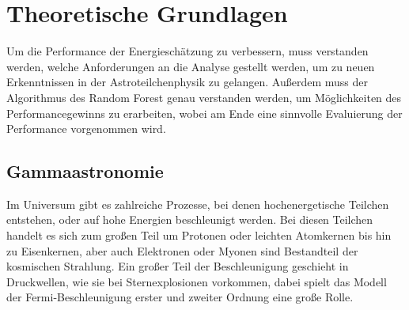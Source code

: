 \chapter{Theoretische Grundlagen}

Um die Performance der Energieschätzung zu verbessern, muss verstanden werden, welche Anforderungen an die Analyse gestellt
werden, um zu neuen Erkenntnissen in der Astroteilchenphysik zu gelangen.
Außerdem muss der Algorithmus des Random Forest genau verstanden werden, um Möglichkeiten des Performancegewinns zu erarbeiten,
wobei am Ende eine sinnvolle Evaluierung der Performance vorgenommen wird.

\section{Gammaastronomie}
\label{sec:Gammaastronomie}

Im Universum gibt es zahlreiche Prozesse, bei denen hochenergetische Teilchen entstehen, oder auf hohe Energien beschleunigt werden.
Bei diesen Teilchen handelt es sich zum großen Teil um Protonen oder leichten Atomkernen bis hin zu Eisenkernen, aber auch Elektronen oder Myonen
sind Bestandteil der kosmischen Strahlung.
Ein großer Teil der Beschleunigung geschieht in Druckwellen, wie sie bei Sternexplosionen vorkommen, dabei spielt das Modell der
Fermi-Beschleunigung erster und zweiter Ordnung eine große Rolle.
%

